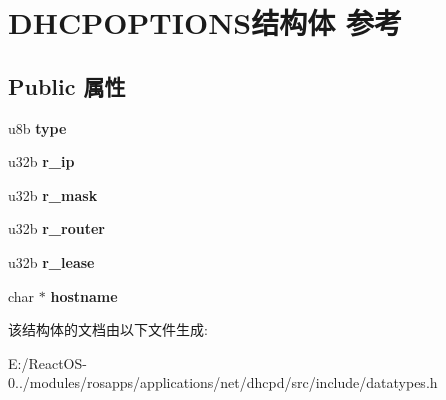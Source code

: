 \hypertarget{struct_d_h_c_p_o_p_t_i_o_n_s}{}\section{D\+H\+C\+P\+O\+P\+T\+I\+O\+N\+S结构体 参考}
\label{struct_d_h_c_p_o_p_t_i_o_n_s}
\subsection*{Public 属性}
\begin{DoxyCompactItemize}
\item 
\mbox{\label{struct_d_h_c_p_o_p_t_i_o_n_s_a5c07d44581c57fe930e8e4bd790d003a}} 
u8b {\bfseries type}
\item 
\mbox{\label{struct_d_h_c_p_o_p_t_i_o_n_s_a34da5aa453ea9a809b5318de7abc501d}} 
u32b {\bfseries r\+\_\+ip}
\item 
\mbox{\label{struct_d_h_c_p_o_p_t_i_o_n_s_a36085895c924ad2133febed2ede542c0}} 
u32b {\bfseries r\+\_\+mask}
\item 
\mbox{\label{struct_d_h_c_p_o_p_t_i_o_n_s_a60bad32019a0a5e983fc9470fdf2f5bf}} 
u32b {\bfseries r\+\_\+router}
\item 
\mbox{\label{struct_d_h_c_p_o_p_t_i_o_n_s_a8f5823131f13d694bc0ad2fdf3a0339b}} 
u32b {\bfseries r\+\_\+lease}
\item 
\mbox{\label{struct_d_h_c_p_o_p_t_i_o_n_s_a6cd7dc12b620272f375c09789cd96af2}} 
char $\ast$ {\bfseries hostname}
\end{DoxyCompactItemize}


该结构体的文档由以下文件生成\+:\begin{DoxyCompactItemize}
\item 
E\+:/\+React\+O\+S-\/0../modules/rosapps/applications/net/dhcpd/src/include/datatypes.\+h\end{DoxyCompactItemize}
